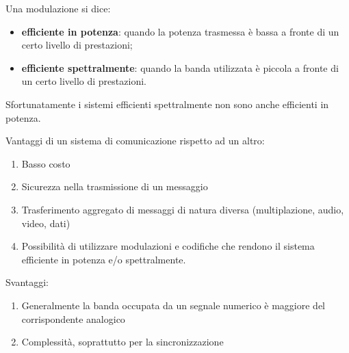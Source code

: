 Una modulazione si dice:
\begin{itemize}
    \item \textbf{efficiente in potenza}: quando la potenza trasmessa è bassa a fronte di un certo livello di prestazioni;
    \item \textbf{efficiente spettralmente}: quando la banda utilizzata è piccola a fronte di un certo livello di prestazioni.
\end{itemize}

Sfortunatamente i sistemi efficienti spettralmente non sono anche efficienti in potenza.

Vantaggi di un sistema di comunicazione rispetto ad un altro:
\begin{enumerate}
    \item Basso costo
    \item Sicurezza nella trasmissione di un messaggio
    \item Trasferimento aggregato di messaggi di natura diversa (multiplazione, audio, video, dati)
    \item Possibilità di utilizzare modulazioni e codifiche che rendono il sistema efficiente in potenza e/o spettralmente.
\end{enumerate}

Svantaggi:
\begin{enumerate}
    \item Generalmente la banda occupata da un segnale numerico è maggiore del corrispondente analogico
    \item Complessità, soprattutto per la sincronizzazione
\end{enumerate}

